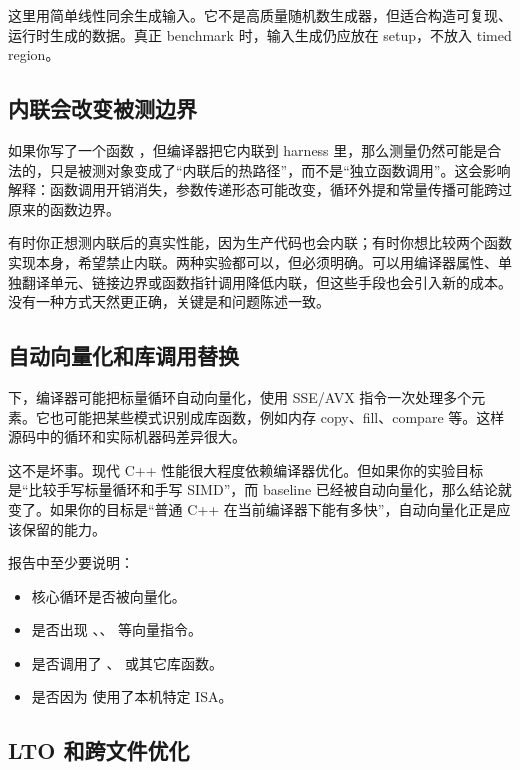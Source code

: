 这里用简单线性同余生成输入。它不是高质量随机数生成器，但适合构造可复现、运行时生成的数据。真正 benchmark 时，输入生成仍应放在 setup，不放入 timed region。

\subsection{内联会改变被测边界}

如果你写了一个函数 ，但编译器把它内联到 harness 里，那么测量仍然可能是合法的，只是被测对象变成了“内联后的热路径”，而不是“独立函数调用”。这会影响解释：函数调用开销消失，参数传递形态可能改变，循环外提和常量传播可能跨过原来的函数边界。

有时你正想测内联后的真实性能，因为生产代码也会内联；有时你想比较两个函数实现本身，希望禁止内联。两种实验都可以，但必须明确。可以用编译器属性、单独翻译单元、链接边界或函数指针调用降低内联，但这些手段也会引入新的成本。没有一种方式天然更正确，关键是和问题陈述一致。

\subsection{自动向量化和库调用替换}

 下，编译器可能把标量循环自动向量化，使用 SSE/AVX 指令一次处理多个元素。它也可能把某些模式识别成库函数，例如内存 copy、fill、compare 等。这样源码中的循环和实际机器码差异很大。

这不是坏事。现代 C++ 性能很大程度依赖编译器优化。但如果你的实验目标是“比较手写标量循环和手写 SIMD”，而 baseline 已经被自动向量化，那么结论就变了。如果你的目标是“普通 C++ 在当前编译器下能有多快”，自动向量化正是应该保留的能力。

报告中至少要说明：

\begin{itemize}
  \item 核心循环是否被向量化。
  \item 是否出现 、、 等向量指令。
  \item 是否调用了 、 或其它库函数。
  \item 是否因为  使用了本机特定 ISA。
\end{itemize}

\subsection{LTO 和跨文件优化}

